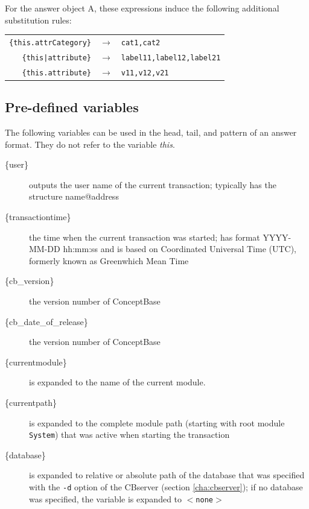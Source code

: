 For the answer object A, these expressions induce the following additional substitution rules:

\begin{tabular}{rcl}
    \verb+{this.attrCategory}+ & $\longrightarrow$ & {\tt cat1,cat2} \\
    \verb+{this|attribute}+ & $\longrightarrow$ & {\tt label11,label12,label21} \\
    \verb+{this.attribute}+ & $\longrightarrow$ & {\tt v11,v12,v21}\\
\end{tabular}


\subsection{Pre-defined variables}

The following variables can be used in the head, tail, and pattern of an answer format. They
do not refer to the variable {\em this}.

\begin{description}

\item[\{user\}]
outputs the user name of the current transaction; typically has the structure name@address

\item[\{transactiontime\}]
the time when the current transaction was started; has format YYYY-MM-DD hh:mm:ss and is based on Coordinated Universal Time (UTC),
formerly known as Greenwhich Mean Time

\item[\{cb\_version\}]
the version number of ConceptBase

\item[\{cb\_date\_of\_release\}]
the version number of ConceptBase

\item[\{currentmodule\}] is expanded to the name of the current module.

\item[\{currentpath\}] is expanded to the complete module path (starting with root module
   {\tt System}) that was active when starting the transaction

\item[\{database\}] is expanded to relative or absolute path of the database that was specified with the
   {\tt -d} option of the CBserver (section \ref{cha:cbserver}); if no database was specified, the
   variable is expanded to {\tt $<$none$>$}

\end{description}

